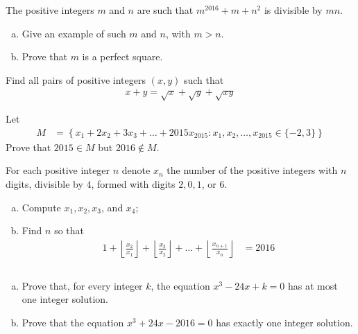 \documentclass[problems.tex]{subfile}
\begin{document}
	\begin{problem}
		The positive integers $m$ and $n$ are such that $m^{2016}+m+n^2$ is divisible
		by $mn$.
		\begin{enumerate}[(a)]
			\item Give an example of such $m$ and $n$, with $m > n$.
			\item Prove that $m$ is a perfect square.
		\end{enumerate}
	\end{problem}

	\begin{problem}
		Find all pairs of positive integers $(x,y)$ such that
		\begin{align*}
			x + y = \sqrt x + \sqrt y + \sqrt{xy}
		\end{align*}
	\end{problem}

	\begin{problem}
		Let
		\begin{align*}
			M &= \left\{x_1 + 2x_2 + 3x_3 + \dots + 2015x_{2015} : x_1, x_2, \dots, 	x_{2015} \in \{-2, 3\}\right\}
		\end{align*}
		Prove that $2015 \in M$ but $2016 \not \in M$.
	\end{problem}

	\begin{problem}
		For each positive integer $n$ denote $x_n$ the number of the positive
		integers with $n$ digits, divisible by $4$, formed with digits $2, 0, 1$, or $6$.
		\begin{enumerate}[(a)]
			\item Compute $x_1, x_2, x_3$, and $x_4$;
			\item Find $n$ so that
			\begin{align*}
				1 + \left\lfloor \frac{x_2}{x_1}\right\rfloor + \left\lfloor \frac{x_3}{x_2}\right\rfloor + \dots + \left\lfloor \frac{x_{n+1}}{x_n}\right\rfloor
					& = 2016
			\end{align*}
		\end{enumerate}
	\end{problem}

	\begin{problem}
		$ $
		\begin{enumerate}[(a)]
			\item Prove that, for every integer $k$, the equation $x^3 - 24x + k = 0$ has at most one integer solution.
			\item Prove that the equation $x^3 + 24x - 2016 = 0$ has exactly one integer solution.
		\end{enumerate}
	\end{problem}
\end{document}
